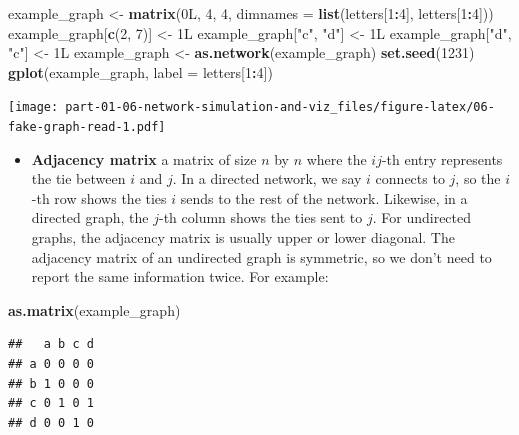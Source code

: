 \documentclass[]{book}
\newenvironment{Shaded}{\begin{snugshade}}{\end{snugshade}}
\newcommand{\DataTypeTok}[1]{\textcolor[rgb]{0.13,0.29,0.53}{#1}}
\newcommand{\DecValTok}[1]{\textcolor[rgb]{0.00,0.00,0.81}{#1}}
\newcommand{\KeywordTok}[1]{\textcolor[rgb]{0.13,0.29,0.53}{\textbf{#1}}}
\newcommand{\NormalTok}[1]{#1}
\newcommand{\OperatorTok}[1]{\textcolor[rgb]{0.81,0.36,0.00}{\textbf{#1}}}
\newcommand{\StringTok}[1]{\textcolor[rgb]{0.31,0.60,0.02}{#1}}
\providecommand{\tightlist}{%
  \setlength{\itemsep}{0pt}\setlength{\parskip}{0pt}}
\begin{document}
\begin{Shaded}
\begin{Highlighting}[]
\NormalTok{example_graph <-}\StringTok{ }\KeywordTok{matrix}\NormalTok{(0L, }\DecValTok{4}\NormalTok{, }\DecValTok{4}\NormalTok{, }\DataTypeTok{dimnames =} \KeywordTok{list}\NormalTok{(letters[}\DecValTok{1}\OperatorTok{:}\DecValTok{4}\NormalTok{], letters[}\DecValTok{1}\OperatorTok{:}\DecValTok{4}\NormalTok{]))}
\NormalTok{example_graph[}\KeywordTok{c}\NormalTok{(}\DecValTok{2}\NormalTok{, }\DecValTok{7}\NormalTok{)] <-}\StringTok{ }\NormalTok{1L}
\NormalTok{example_graph[}\StringTok{"c"}\NormalTok{, }\StringTok{"d"}\NormalTok{] <-}\StringTok{ }\NormalTok{1L}
\NormalTok{example_graph[}\StringTok{"d"}\NormalTok{, }\StringTok{"c"}\NormalTok{] <-}\StringTok{ }\NormalTok{1L}
\NormalTok{example_graph <-}\StringTok{ }\KeywordTok{as.network}\NormalTok{(example_graph)}
\KeywordTok{set.seed}\NormalTok{(}\DecValTok{1231}\NormalTok{)}
\KeywordTok{gplot}\NormalTok{(example_graph, }\DataTypeTok{label =}\NormalTok{ letters[}\DecValTok{1}\OperatorTok{:}\DecValTok{4}\NormalTok{])}
\end{Highlighting}
\end{Shaded}

\texttt{[image: part-01-06-network-simulation-and-viz\_files/figure-latex/06-fake-graph-read-1.pdf]}

\begin{itemize}
\tightlist
\item
  \textbf{Adjacency matrix} a matrix of size \(n\) by \(n\) where the \(ij\)-th entry represents
  the tie between \(i\) and \(j\). In a directed network, we say \(i\) connects to \(j\),
  so the \(i\)-th row shows the ties \(i\) sends to the rest of the network. Likewise,
  in a directed graph, the \(j\)-th column shows the ties sent to \(j\). For undirected
  graphs, the adjacency matrix is usually upper or lower diagonal. The adjacency
  matrix of an undirected graph is symmetric, so we don't need to report the same
  information twice. For example:
\end{itemize}

\begin{Shaded}
\begin{Highlighting}[]
\KeywordTok{as.matrix}\NormalTok{(example_graph)}
\end{Highlighting}
\end{Shaded}

\begin{verbatim}
##   a b c d
## a 0 0 0 0
## b 1 0 0 0
## c 0 1 0 1
## d 0 0 1 0
\end{verbatim}
\end{document}
